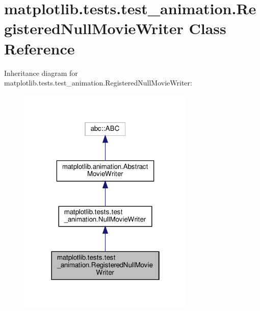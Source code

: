 \hypertarget{classmatplotlib_1_1tests_1_1test__animation_1_1RegisteredNullMovieWriter}{}\section{matplotlib.\+tests.\+test\+\_\+animation.\+Registered\+Null\+Movie\+Writer Class Reference}
\label{classmatplotlib_1_1tests_1_1test__animation_1_1RegisteredNullMovieWriter}


Inheritance diagram for matplotlib.\+tests.\+test\+\_\+animation.\+Registered\+Null\+Movie\+Writer\+:
\nopagebreak
\begin{figure}[H]
\begin{center}
\leavevmode
\includegraphics[width=238pt]{classmatplotlib_1_1tests_1_1test__animation_1_1RegisteredNullMovieWriter__inherit__graph}
\end{center}
\end{figure}


